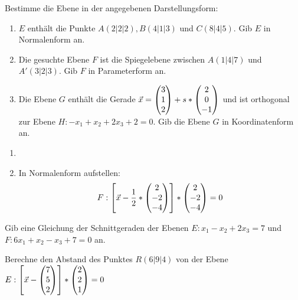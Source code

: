 






Bestimme die Ebene in der angegebenen Darstellungsform:
\begin{enumerate}
	\item $E$ enthält die Punkte $A(2|2|2), B(4|1|3)$ und $C(8|4|5)$. Gib $E$ in Normalenform an. %
	\item Die gesuchte Ebene $F$ ist die Spiegelebene zwischen $A(1|4|7)$ und $A'(3|2|3)$. Gib $F$ in Parameterform an. %
	\item Die Ebene $G$ enthält die Gerade $\vec x = \begin{pmatrix} 3\\1\\2 \end{pmatrix}+s*\begin{pmatrix} 2\\0\\-1 \end{pmatrix}$ und ist orthogonal zur Ebene $H:-x_1+x_2+2x_3+2=0$. Gib die Ebene $G$ in Koordinatenform an. %
\end{enumerate}
\begin{lsg}{}
	\begin{enumerate}
		\item
		\item In Normalenform aufstellen:
		\begin{equation*}
			F: \left[\vec x - \frac 12 *\begin{pmatrix} 2\\-2\\-4 \end{pmatrix}\right]*\begin{pmatrix} 2\\-2\\-4 \end{pmatrix}=0
		\end{equation*}
	\end{enumerate}
\end{lsg}

Gib eine Gleichung der Schnittgeraden der Ebenen $E: x_1-x_2+2x_3=7$ und $F:6x_1+x_2-x_3+7=0$ an.
\begin{lsg}{}

\end{lsg}






Berechne den Abstand des Punktes $R(6|9|4)$ von der Ebene $E: \left[ \vec x -  \begin{pmatrix} 7 \\ 5\\ 2 \end{pmatrix}\right]*\begin{pmatrix} 2\\ 2 \\1 \end{pmatrix}=0$



